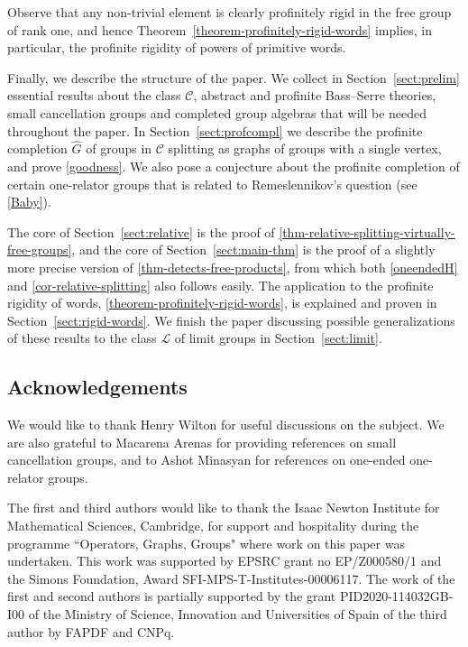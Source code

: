 \documentclass[a4paper]{amsart}
\theoremstyle{definition}
\theoremstyle{remark}
\begin{document}
Observe that any non-trivial element is clearly profinitely rigid in the free group of rank one, and hence Theorem~\ref{theorem-profinitely-rigid-words} implies, in particular, the profinite rigidity of powers of primitive words.

\medskip

Finally, we describe the structure of the paper. We collect in Section~\ref{sect:prelim} essential results about the class \(\mathcal{C}\), abstract and profinite Bass--Serre theories, small cancellation groups and completed group algebras that will be needed throughout the paper. In Section~\ref{sect:profcompl} we describe the profinite completion \(\widehat{G}\) of groups in \(\mathcal{C}\) splitting as graphs of groups with a single vertex, and prove \cref{goodness}. We also pose a conjecture about the profinite completion of certain one-relator groups that is related to Remeslennikov's question (see \cref{Baby}).

The core of Section~\ref{sect:relative} is the proof of \cref{thm-relative-splitting-virtually-free-groups}, and the core of Section~\ref{sect:main-thm} is the proof of a slightly more precise version of \cref{thm-detects-free-products}, from which both \cref{oneendedH} and \cref{cor-relative-splitting} also follows easily. The application to the profinite rigidity of words, \cref{theorem-profinitely-rigid-words}, is explained and proven in Section~\ref{sect:rigid-words}. We finish the paper discussing possible generalizations of these results to the class \(\mathcal{L}\) of limit groups in Section~\ref{sect:limit}.


\subsection*{Acknowledgements}

We would like to thank Henry Wilton for useful discussions on the subject. We are also grateful to Macarena Arenas for providing references on small cancellation groups, and to Ashot Minasyan for references on one-ended one-relator groups.

The first and third authors would like to thank the Isaac Newton Institute for Mathematical Sciences, Cambridge, for support and hospitality during the programme ``Operators, Graphs, Groups" where work on this paper was undertaken. This work was supported by EPSRC grant no EP/Z000580/1 and the Simons Foundation, Award SFI-MPS-T-Institutes-00006117.
The work of the first and second authors is partially supported by the grant  {PID2020-114032GB-I00}  of the Ministry of Science, Innovation and Universities of Spain of the third author by FAPDF and CNPq.
\end{document}
